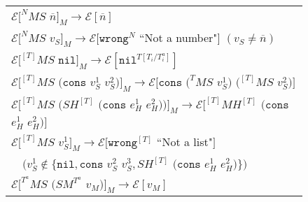 \begin{figure}[p]
\centering
\begin{tabular}{l}
\vspace{5pt}

$\mathscr{E}[^{N}MS$ $\overline{n}]_{M}\rightarrow\mathscr{E}[\overline{n}]$ \\

\vspace{5pt}

$\mathscr{E}[^{N}MS$ $v_{S}]_{M}\rightarrow\mathscr{E}[\mathtt{wrong}^{N}$ ``Not a number"$]$ $(v_{S}\neq\overline{n})$ \\

\vspace{5pt}

$\mathscr{E}[^{[T]}MS$ $\mathtt{nil}]_{M}\rightarrow\mathscr{E}[\mathtt{nil}^{T[T_{i}/T_{i}^{a}]}]$ \\

\vspace{5pt}

$\mathscr{E}[^{[T]}MS$ $(\mathtt{cons}$ $v_{S}^{1}$ $v_{S}^{2})]_{M}\rightarrow\mathscr{E}[\mathtt{cons}$ $(^{T}MS$ $v_{S}^{1})$ $(^{[T]}MS$ $v_{S}^{2})]$ \\

\vspace{5pt}

$\mathscr{E}[^{[T]}MS$ $(SH^{[T]}$ $(\mathtt{cons}$ $e_{H}^{1}$ $e_{H}^{2}))]_{M}\rightarrow\mathscr{E}[^{[T]}MH^{[T]}$ $(\mathtt{cons}$ $e_{H}^{1}$ $e_{H}^{2})]$ \\

\vspace{5pt}

$\mathscr{E}[^{[T]}MS$ $v_{S}^{1}]_{M}\rightarrow\mathscr{E}[\mathtt{wrong}^{[T]}$ ``Not a list"$]$ \\

\vspace{5pt}

$\quad(v_{S}^{1}\not\in\lbrace\mathtt{nil},\mathtt{cons}$ $v_{S}^{2}$ $v_{S}^{3},SH^{[T]}$ $(\mathtt{cons}$ $e_{H}^{1}$ $e_{H}^{2})\rbrace)$ \\

\vspace{5pt}

$\mathscr{E}[^{T^{a}}MS$ $(SM^{T^{a}}$ $v_{M})]_{M}\rightarrow\mathscr{E}[v_{M}]$ \\


\end{tabular}
\end{figure}
